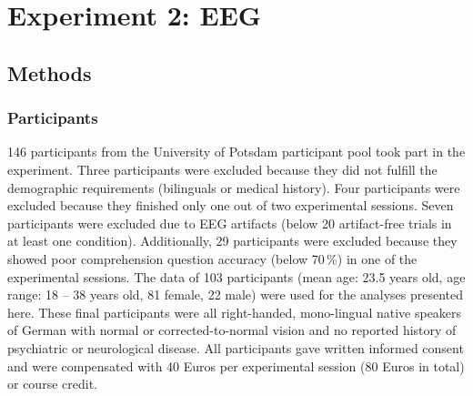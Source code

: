 \documentclass[review,preprint,12pt,authoryear,floatsintext]{elsarticle}
\begin{document}
\section*{Experiment 2: EEG}
\subsection*{Methods}
\subsubsection*{Participants}
146 participants from the University of Potsdam participant pool took part in the experiment. Three participants were excluded because they did not fulfill the demographic requirements (bilinguals or medical history). Four participants were excluded because they finished only one out of two experimental sessions. Seven participants were excluded due to EEG artifacts (below 20 artifact-free trials in at least one condition). Additionally, 29 participants were excluded because they showed poor comprehension question accuracy (below 70\,\%) in one of the experimental sessions. The data of 103 participants (mean age: 23.5 years old, age range: 18 -- 38 years old, 81 female, 22 male) were used for the analyses presented here. These final participants were all right-handed, mono-lingual native speakers of German with normal or corrected-to-normal vision and no reported history of psychiatric or neurological disease. All participants gave written informed consent and were compensated with 40 Euros per experimental session (80 Euros in total) or course credit.
\end{document}
